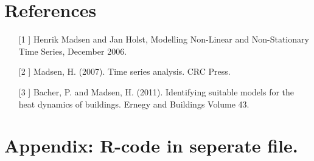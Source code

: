 \documentclass[
]{article}
\begin{document}
\FloatBarrier

\hypertarget{references}{%
\section{References}\label{references}}

\begin{itemize}
  \item[[1]] Henrik Madsen and Jan Holst, Modelling Non-Linear and Non-Stationary Time Series, December 2006. 
  \item[[2]] Madsen, H. (2007). Time series analysis. CRC Press.
  \item[[3]] Bacher, P. and Madsen, H. (2011). Identifying suitable models for the heat dynamics of buildings. Ernegy and Buildings Volume 43. 
\end{itemize}

\hypertarget{appendix-r-code-in-seperate-file.}{%
\section{Appendix: R-code in seperate
file.}\label{appendix-r-code-in-seperate-file.}}
\end{document}
